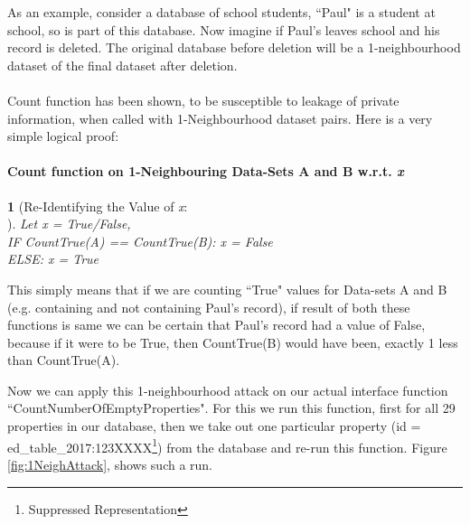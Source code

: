\documentclass[12pt]{report}
\theoremstyle{named}
\newtheorem*{namedtheorem}{}
\begin{document}
As an example, consider a database of school students, ``Paul" is a student at school, so is part of this database. Now imagine if Paul's leaves school and his record is deleted. The original database before deletion will be a 1-neighbourhood dataset of the final dataset after deletion.
\paragraph{}
Count function has been shown, to be susceptible to leakage of private information, when called with 1-Neighbourhood dataset pairs. Here is a very simple logical proof:


\paragraph{Count function on 1-Neighbouring Data-Sets A and B w.r.t. \textit{x}}
\begin{namedtheorem}[Re-Identifying the Value of \textit{x}:\\] 

Let x = True/False,\\ IF CountTrue(A) == CountTrue(B): x = False\\ELSE: x = True

\end{namedtheorem}

This simply means that if we are counting ``True" values for Data-sets A and B (e.g. containing and not containing Paul's record), if result of both these functions is same we can be certain that Paul's record had a value of False, because if it were to be True, then CountTrue(B) would have been, exactly 1 less than CountTrue(A).


Now we can apply this 1-neighbourhood attack on our actual interface function ``CountNumberOfEmptyProperties". For this we run this function, first for all 29 properties in our database, then we take out one particular property (id = ed\_table\_2017:123XXXX\footnote{Suppressed Representation}) from the database and re-run this function. Figure \ref{fig:1NeighAttack}, shows such a run.
\end{document}
